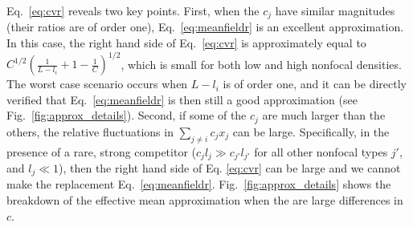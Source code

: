 \documentclass[12pt]{article}
\begin{document}
Eq.~\eqref{eq:cvr} reveals two key points. First, when the $c_j$ have similar magnitudes (their ratios are of order one), Eq.~\eqref{eq:meanfieldr} is an excellent approximation. In this case, the right hand side of Eq.~\eqref{eq:cvr} is approximately equal to $C^{1/2}\left(\frac{1}{L-l_i}+1-\frac{1}{C}\right)^{1/2}$, which is small for both low and high nonfocal densities. The worst case scenario occurs when $L-l_i$ is of order one, and it can be directly verified that Eq.~\eqref{eq:meanfieldr} is then still a good approximation (see Fig.~\ref{fig:approx_details}). Second, if some of the $c_j$ are much larger than the others, the relative fluctuations in $\sum_{j\neq i} c_j x_j$ can be large. Specifically, in the presence of a rare,  strong competitor ($c_j l_j\gg c_{j'} l_{j'}$ for all other nonfocal types $j'$, and $l_j\ll 1$), then the right hand side of Eq. \eqref{eq:cvr} can be large and we cannot make the replacement Eq.~\eqref{eq:meanfieldr}. Fig.~\ref{fig:approx_details} shows the breakdown of the effective mean approximation when the are large differences in $c$. 
\end{document}
